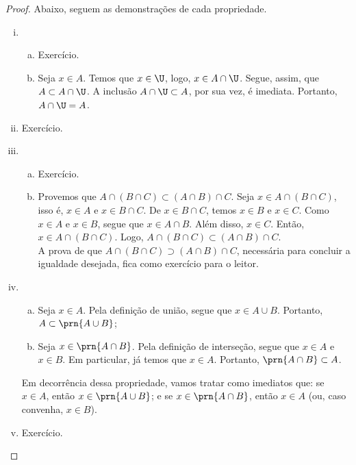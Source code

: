 \begin{proof}
Abaixo, seguem as demonstrações de cada propriedade.
\begin{enumerate}[i)]
    \item 
        \begin{enumerate}[a)]
            \item Exercício.
            \item Seja $x\in A$. Temos que $x \in \U$, logo, $x \in A\cap \U$.
            Segue, assim, que $A \subset A\cap \U$. A inclusão $A\cap \U\subset A$, 
            por sua vez, é imediata. Portanto, $A\cap \U = A$.
        \end{enumerate}
    \item Exercício.

    \item
        \begin{enumerate}[a)]
            \item Exercício.
            \item
                Provemos que $A \cap (B \cap C) \subset (A \cap B) \cap C$. Seja $x \in A \cap (B \cap C)$, isso é, $x \in A$ e $x \in B \cap C$. De $x \in B \cap C$, temos $x \in B$ e $x \in C$. Como $x \in A$ e $x \in B$, segue que $x \in A \cap B$. Além disso, $x \in C$. Então, $x \in A \cap (B \cap C)$. Logo, $A \cap (B \cap C) \subset (A \cap B) \cap C$. \\
                A prova de que $A \cap (B \cap C) \supset (A \cap B) \cap C$, necessária para concluir a igualdade desejada, fica como exercício para o leitor.
        \end{enumerate}

    \item 	
        \begin{enumerate}[a)]
            \item
                Seja $x \in A$. Pela definição de união, segue que $x \in A \cup B$. Portanto, $A \subset \prn{A \cup B}$;
            \item
                Seja $x \in \prn{A \cap B}$. Pela definição de interseção, segue que $x\in A$ e $x \in B$. Em particular, já temos que $x \in A$. Portanto, $\prn{A \cap B} \subset A$.
        \end{enumerate}
        Em decorrência dessa propriedade, vamos tratar como imediatos que: se $x \in A$, então $x \in \prn{A \cup B}$; e se $x \in \prn{A \cap B}$, então $x\in A$ (ou, caso convenha, $x\in B$).

    \item Exercício.


\end{enumerate}
\end{proof}
